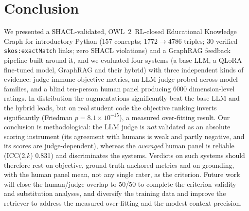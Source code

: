 \documentclass[sageh]{sagej}
\begin{document}
\section{Conclusion}
We presented a SHACL-validated, OWL~2~RL-closed Educational Knowledge Graph for introductory Python (157 concepts; 1772$\rightarrow$4786 triples; 30 verified \texttt{skos:exactMatch} links; zero SHACL violations) and a GraphRAG feedback pipeline built around it, and we evaluated four systems (a base LLM, a QLoRA-fine-tuned model, GraphRAG and their hybrid) with three independent kinds of evidence: judge-immune objective metrics, an LLM judge probed across model families, and a blind ten-person human panel producing 6000 dimension-level ratings. In distribution the augmentations significantly beat the base LLM and the hybrid leads, but on real student code the objective ranking inverts significantly (Friedman $p=8.1\times10^{-15}$), a measured over-fitting result. Our conclusion is methodological: the LLM judge is \emph{not} validated as an absolute scoring instrument (its agreement with humans is weak and partly negative, and its scores are judge-dependent), whereas the \emph{averaged} human panel is reliable (ICC(2,$k$) 0.831) and discriminates the systems. Verdicts on such systems should therefore rest on objective, ground-truth-anchored metrics and on grounding, with the human panel mean, not any single rater, as the criterion. Future work will close the human/judge overlap to 50/50 to complete the criterion-validity and substitution analyses, and diversify the training data and improve the retriever to address the measured over-fitting and the modest context precision.

\end{document}
